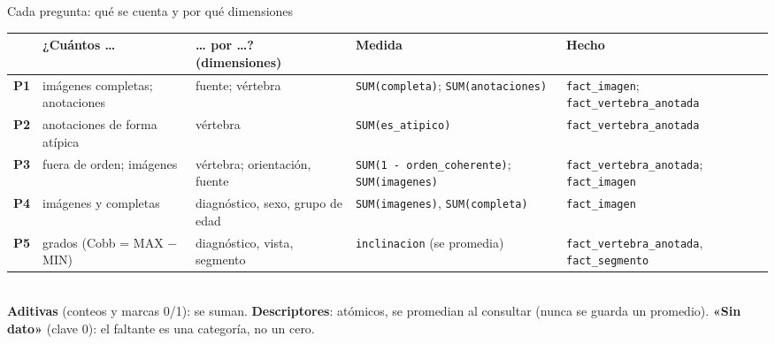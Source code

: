 \documentclass[aspectratio=169,10pt]{beamer}
\begin{document}
\begin{frame}{Cada pregunta: qué se cuenta y por qué dimensiones}
  \footnotesize
  \renewcommand{\arraystretch}{1.12}
  \begin{tabularx}{\linewidth}{@{}l>{\raggedright\arraybackslash}X>{\raggedright\arraybackslash}X>{\raggedright\arraybackslash}p{4.1cm}>{\raggedright\arraybackslash}p{3.5cm}@{}}
    \toprule
    & ¿Cuántos … & … por …? (dimensiones) & Medida & Hecho \\ \midrule
    \textbf{\color{itba}P1} & imágenes completas; anotaciones & fuente; vértebra & \texttt{SUM(completa)}; \texttt{SUM(anotaciones)} & \texttt{fact\_imagen}; \texttt{fact\_vertebra\_anotada} \\
    \textbf{\color{itba}P2} & anotaciones de forma atípica & vértebra & \texttt{SUM(es\_atipico)} & \texttt{fact\_vertebra\_anotada} \\
    \textbf{\color{itba}P3} & fuera de orden; imágenes & vértebra; orientación, fuente & \texttt{SUM(1 - orden\_coherente)}; \texttt{SUM(imagenes)} & \texttt{fact\_vertebra\_anotada}; \texttt{fact\_imagen} \\
    \textbf{\color{itba}P4} & imágenes y completas & diagnóstico, sexo, grupo de edad & \texttt{SUM(imagenes)}, \texttt{SUM(completa)} & \texttt{fact\_imagen} \\
    \textbf{\color{itba}P5} & grados (Cobb = MAX $-$ MIN) & diagnóstico, vista, segmento & \texttt{inclinacion} (se promedia) & \texttt{fact\_vertebra\_anotada}, \texttt{fact\_segmento} \\ \bottomrule
  \end{tabularx}\\[1ex]
  \footnotesize
  \textbf{Aditivas} (conteos y marcas 0/1): se suman. \textbf{Descriptores}: atómicos, se promedian al consultar (nunca se guarda un promedio). \textbf{«Sin dato»} (clave 0): el faltante es una categoría, no un cero.
\end{frame}
\end{document}
